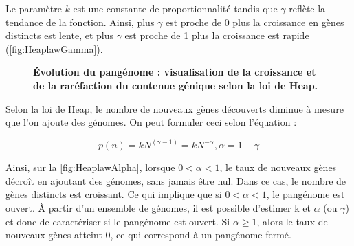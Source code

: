 Le paramètre $k$ est une constante de proportionnalité tandis que $\gamma$ reflète la tendance de la fonction. Ainsi, plus $\gamma$ est proche de 0 plus la croissance en gènes distincts est lente, et plus $\gamma$ est proche de 1 plus la croissance est rapide (\autoref{fig:HeaplawGamma}).

\begin{figure}[htbp]
    \centering
    \hfill
    \caption[Évolution du pangénome : visualisation de la croissance et de la raréfaction du contenue génique selon la loi de Heap]{\textbf{Évolution du pangénome : visualisation de la croissance et de la raréfaction du contenue génique selon la loi de Heap.}}
    \label{fig:Heaplaw}
\end{figure}

Selon la loi de Heap, le nombre de nouveaux gènes découverts diminue à mesure que l'on ajoute des génomes. On peut formuler ceci selon l'équation : 

\begin{equation}
    p(n)=kN^{(\gamma-1)}=kN^{-\alpha}, \alpha=1-\gamma
\end{equation}

Ainsi, sur la \autoref{fig:HeaplawAlpha}, lorsque $0<\alpha<1$, le taux de nouveaux gènes décroît en ajoutant des génomes, sans jamais être nul. Dans ce cas, le nombre de gènes distincts est croissant. Ce qui implique que si $0<\alpha<1$, le pangénome est ouvert. À partir d'un ensemble de génomes, il est possible d'estimer k et $\alpha$ (ou $\gamma$) et donc de caractériser si le pangénome est ouvert. Si $\alpha\geq1$, alors le taux de nouveaux gènes atteint 0, ce qui correspond à un pangénome fermé. 

